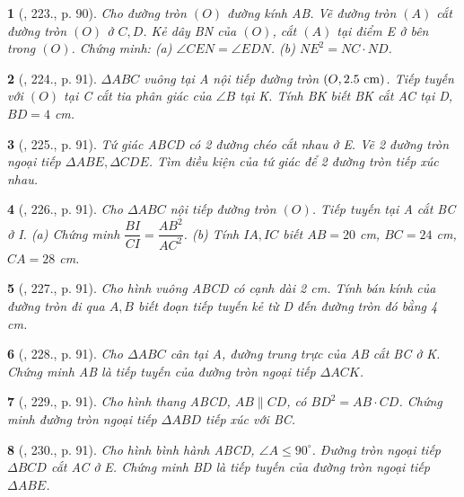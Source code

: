 \documentclass{article}
\newtheorem{baitoan}{}
\begin{document}
\begin{baitoan}[\cite{Binh_Toan_9_tap_2}, 223., p. 90]
	Cho đường tròn $(O)$ đường kính AB. Vẽ đường tròn $(A)$ cắt đường tròn $(O)$ ở $C,D$. Kẻ dây BN của $(O)$, cắt $(A)$ tại điểm E ở bên trong $(O)$. Chứng minh: (a) $\angle{CEN} = \angle{EDN}$. (b) $NE^2 = NC\cdot ND$.
\end{baitoan}

\begin{baitoan}[\cite{Binh_Toan_9_tap_2}, 224., p. 91]
	$\Delta ABC$ vuông tại A nội tiếp đường tròn $(O,2.5\ {\rm cm})$. Tiếp tuyến với $(O)$ tại C cắt tia phân giác của $\angle{B}$ tại K. Tính BK biết BK cắt AC tại D, $BD = 4$ {\rm cm}.
\end{baitoan}

\begin{baitoan}[\cite{Binh_Toan_9_tap_2}, 225., p. 91]
	Tứ giác ABCD có 2 đường chéo cắt nhau ở E. Vẽ 2 đường tròn ngoại tiếp $\Delta ABE,\Delta CDE$. Tìm điều kiện của tứ giác để 2 đường tròn tiếp xúc nhau.
\end{baitoan}

\begin{baitoan}[\cite{Binh_Toan_9_tap_2}, 226., p. 91]
	Cho $\Delta ABC$ nội tiếp đường tròn $(O)$. Tiếp tuyến tại A cắt BC ở I. (a) Chứng minh $\dfrac{BI}{CI} = \dfrac{AB^2}{AC^2}$. (b) Tính $IA,IC$ biết $AB = 20$ {\rm cm}, $BC = 24$ {\rm cm}, $CA = 28$ {\rm cm}.
\end{baitoan}

\begin{baitoan}[\cite{Binh_Toan_9_tap_2}, 227., p. 91]
	Cho hình vuông ABCD có cạnh dài {\rm2 cm}. Tính bán kính của đường tròn đi qua $A,B$ biết đoạn tiếp tuyến kẻ từ D đến đường tròn đó bằng {\rm4 cm}.
\end{baitoan}

\begin{baitoan}[\cite{Binh_Toan_9_tap_2}, 228., p. 91]
	Cho $\Delta ABC$ cân tại A, đường trung trực của AB cắt BC ở K. Chứng minh AB là tiếp tuyến của đường tròn ngoại tiếp $\Delta ACK$.
\end{baitoan}

\begin{baitoan}[\cite{Binh_Toan_9_tap_2}, 229., p. 91]
	Cho hình thang ABCD, $AB\parallel CD$, có $BD^2 = AB\cdot CD$. Chứng minh đường tròn ngoại tiếp $\Delta ABD$ tiếp xúc với BC.
\end{baitoan}

\begin{baitoan}[\cite{Binh_Toan_9_tap_2}, 230., p. 91]
	Cho hình bình hành ABCD, $\angle{A}\le90^\circ$. Đường tròn ngoại tiếp $\Delta BCD$ cắt AC ở E. Chứng minh BD là tiếp tuyến của đường tròn ngoại tiếp $\Delta ABE$.
\end{baitoan}
\end{document}
